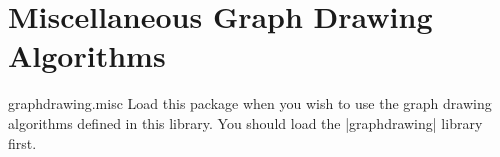 %
%
%

\section{Miscellaneous Graph Drawing Algorithms}


\begin{tikzlibrary}{graphdrawing.misc}
  Load this package when you wish to use the graph drawing algorithms
  defined in this library. You should load the |graphdrawing| library first.
\end{tikzlibrary}

\ifluatex\relax{}\expandafter\endinput\fi


